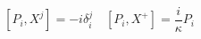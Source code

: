 \begin{equation}\label{11a}
\left[P_{i},X^{j}\right]=-i\delta_{i}^{j}\quad
\left[P_{i},X^{+}\right]=\frac{i}{\kappa}P_i
\end{equation}

